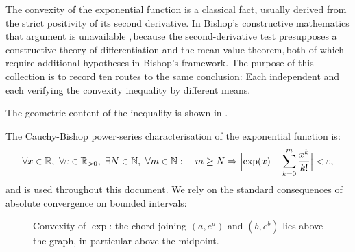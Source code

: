 \documentclass[11pt,reqno]{amsart}
\makeatletter
\providecommand{\R}{\mathbb{R}}
\providecommand{\N}{\mathbb{N}}
\theoremstyle{redplain}
\providecommand{\comma}{,\,}
\renewenvironment{quotation}
{\list{}{\listparindent\z@
		\itemindent\z@
		\rightmargin\leftmargin
		\parsep\z@}	\item\relax}
{\endlist}
\numberwithin{equation}{section}
\makeatother
\begin{document}
\begin{quotation}
\label{sec:introduction} \vspace{0.5in}The convexity of the exponential
function is a classical fact, usually derived from the strict positivity of
its second derivative.\newline
\noindent In Bishop's constructive mathematics that argument is unavailable%
\comma because the second-derivative test presupposes a constructive theory
of differentiation and the mean value theorem\comma both of which require
additional hypotheses in Bishop's framework.\newline
\noindent The purpose of this collection is to record ten routes to the same
conclusion:\newline
Each independent and each verifying the convexity inequality by different
means.

\noindent The geometric content of the inequality is shown in %
. \noindent

The Cauchy-Bishop power-series characterisation of the exponential function
is: 
\begin{equation}
\forall x\in \R,\ \forall \varepsilon \in \R_{>0},\ \exists N\in \N,\
\forall m\in \N:\quad m\geq N\Rightarrow \Bigl|\exp (x)-\sum_{k=0}^{m}\frac{%
x^{k}}{k!}\Bigr|<\varepsilon ,
\end{equation}%
and is used throughout this document.\newline
\noindent We rely on the standard consequences of absolute convergence on
bounded intervals:
\end{quotation}

\begin{figure}[tbph]
\centering
{}
\caption{Convexity of $\exp $: the chord joining $(a,e^{a})$ and $(b,e^{b})$
lies above the graph, in particular above the midpoint.}
\label{fig:convex-exp}
\end{figure}
\end{document}

